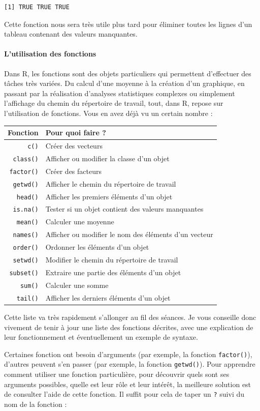 \documentclass[a4paperpaper,]{article}
\let\oldparagraph\paragraph
\renewcommand{\paragraph}[1]{\oldparagraph{#1}\mbox{}}
\theoremstyle{definition}
\theoremstyle{definition}
\theoremstyle{definition}
\theoremstyle{remark}
\begin{document}
\begin{verbatim}
[1] TRUE TRUE TRUE
\end{verbatim}

Cette fonction nous sera très utile plus tard pour éliminer toutes les
lignes d'un tableau contenant des valeurs manquantes.

\hypertarget{functions}{%
\paragraph{L'utilisation des fonctions}\label{functions}}

Dans R, les fonctions sont des objets particuliers qui permettent
d'effectuer des tâches très variées. Du calcul d'une moyenne à la
création d'un graphique, en passant par la réalisation d'analyses
statistiques complexes ou simplement l'affichage du chemin du répertoire
de travail, tout, dans R, repose sur l'utilisation de fonctions. Vous en
avez déjà vu un certain nombre :

\begin{longtable}[]{@{}rl@{}}
\toprule
Fonction & Pour quoi faire ?\tabularnewline
\midrule
\endhead
\texttt{c()} & Créer des vecteurs\tabularnewline
\texttt{class()} & Afficher ou modifier la classe d'un
objet\tabularnewline
\texttt{factor()} & Créer des facteurs\tabularnewline
\texttt{getwd()} & Afficher le chemin du répertoire de
travail\tabularnewline
\texttt{head()} & Afficher les premiers éléments d'un
objet\tabularnewline
\texttt{is.na()} & Tester si un objet contient des valeurs
manquantes\tabularnewline
\texttt{mean()} & Calculer une moyenne\tabularnewline
\texttt{names()} & Afficher ou modifier le nom des éléments d'un
vecteur\tabularnewline
\texttt{order()} & Ordonner les éléments d'un objet\tabularnewline
\texttt{setwd()} & Modifier le chemin du répertoire de
travail\tabularnewline
\texttt{subset()} & Extraire une partie des éléments d'un
objet\tabularnewline
\texttt{sum()} & Calculer une somme\tabularnewline
\texttt{tail()} & Afficher les derniers éléments d'un
objet\tabularnewline
\bottomrule
\end{longtable}

Cette liste va très rapidement s'allonger au fil des séances. Je vous
conseille donc vivement de tenir à jour une liste des fonctions
décrites, avec une explication de leur fonctionnement et éventuellement
un exemple de syntaxe.

Certaines fonction ont besoin d'arguments (par exemple, la fonction
\texttt{factor()}), d'autres peuvent s'en passer (par exemple, la
fonction \texttt{getwd()}). Pour apprendre comment utiliser une fonction
particulière, pour découvrir quels sont ses arguments possibles, quelle
est leur rôle et leur intérêt, la meilleure solution est de consulter
l'aide de cette fonction. Il suffit pour cela de taper un \texttt{?}
suivi du nom de la fonction :
\end{document}
